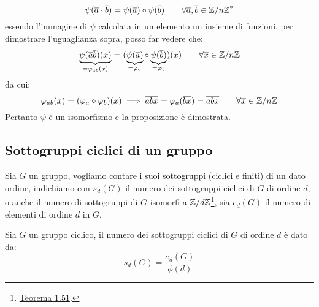 \documentclass[11pt]{scrartcl}
\begin{document}
\begin{remark}
	\[ \psi(\overline a \cdot \overline b) = \psi(\overline a) \circ \psi(\overline b)
	\qquad
	\forall \overline a, \overline b \in {{\mathbb Z}/n{\mathbb Z}}^{*}
	\]
essendo l'immagine di $\psi$ calcolata in un elemento un insieme di funzioni, per dimostrare l'uguaglianza sopra, posso far vedere che:
	\[ \underbrace{\psi(\overline a\overline b)(x)}_{= \varphi_{ab}(x)} = (\underbrace{\psi(\overline a)}_{=\varphi_a} \circ \underbrace{\psi(\overline b)}_{=\varphi_b})(x)
	\qquad
	\forall \overline x \in {\mathbb Z}/n{\mathbb Z}
	\]
da cui:
	\[ \varphi_{ab}(x) = (\varphi_{a}\circ\varphi_{b})(x) \implies \overline{abx} = \varphi_a(\overline{bx}) = \overline{abx}
	\qquad
	\forall \overline x\in {\mathbb Z}/n{\mathbb Z}
	\]
Pertanto $\psi$ è un isomorfismo e la proposizione è dimostrata.
\end{remark}

\newpage

\subsection{Sottogruppi ciclici di un gruppo}
Sia $G$ un gruppo, vogliamo contare i suoi sottogruppi (ciclici e finiti) di un dato ordine, indichiamo con $s_d(G)$ il numero dei sottogruppi ciclici di $G$ di ordine $d$, o anche il numero di sottogruppi di $G$ isomorfi a
 $\mathbb Z/d\mathbb Z$\footnote{\hyperref[g:Iso_ciclici]{Teorema 1.51}.}, sia $e_d(G)$ il numero di elementi di ordine $d$ in $G$.

\begin{proposition}
Sia $G$ un gruppo ciclico, il numero dei sottogruppi ciclici di $G$ di ordine $d$ è dato da:
	\[ s_d(G) = \frac{e_d(G)}{\phi(d)}
	\]
\end{proposition}
\end{document}
